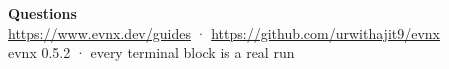 \documentclass[aspectratio=169,10pt]{beamer}
\begin{document}
\begin{frame}[plain]
  \vfill
  \begin{center}
    {\LARGE\textbf{Questions}}\\[1.2em]
    {\small \url{https://www.evnx.dev/guides} · \url{https://github.com/urwithajit9/evnx}}\\[0.8em]
    {\footnotesize\textcolor{evnxMuted}{evnx 0.5.2 · every terminal block is a real run}}
  \end{center}
  \vfill
\end{frame}
\end{document}
